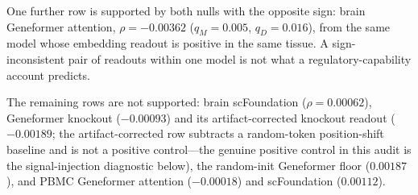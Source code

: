 \documentclass[fleqn,10pt,lineno]{wlpeerj}
\begin{document}
\begin{table}[H]\centering
\resizebox{\linewidth}{!}{}
\caption{Protocol-pass matrix for the thirteen pooled FM/readout rows (yes = pass, no = fail). Dual full / Dual non-deg:
both within-family BH $q_M,q_D<0.05$ under the named confound specification. Concord.:
FM--co-expression Spearman $>0$ (attention-likeness). ND same sign: full and non-degree partial
$\rho$ share sign. Multi-RO sign: all full-spec readouts of the same model family in that tissue
agree in sign (single-readout families pass). $\rho>$ base: full-spec $\rho$ exceeds the
tissue co-expression baseline on the same edge set. Protocol-pass is the conjunction of Dual full,
Concord., ND same sign, Multi-RO sign, and $\rho>$ base (Dual non-deg is reported but not required
beyond same-sign, matching the dual-null failure mode under non-degree). All thirteen rows fail
protocol-pass.}\label{tab:protocol}
\end{table}

One further row is supported by both nulls with the opposite sign: brain Geneformer attention,
$\rho=-0.00362$ ($q_M=0.005$, $q_D=0.016$), from the same model whose embedding readout is positive
in the same tissue. A sign-inconsistent pair of readouts within one model is not what a
regulatory-capability account predicts.

The remaining rows are not supported: brain scFoundation ($\rho=0.00062$), Geneformer knockout
($-0.00093$) and its artifact-corrected knockout readout ($-0.00189$; the artifact-corrected row
subtracts a random-token position-shift baseline and is not a positive control---the genuine
positive control in this audit is the signal-injection diagnostic below), the random-init Geneformer floor
($0.00187$), and PBMC Geneformer attention ($-0.00018$) and scFoundation ($0.00112$).
\end{document}
